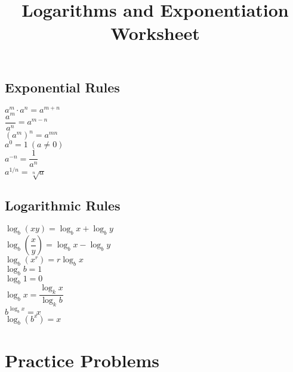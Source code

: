\documentclass[12pt]{article}
\title{Logarithms and Exponentiation Worksheet}
\author{}
\date{}
\begin{document}
\begin{multicols}{2}
\subsection*{Exponential Rules}
\begin{flushleft}
$ a^m \cdot a^n = a^{m+n} $ \\
$ \dfrac{a^m}{a^n} = a^{m-n} $ \\
$ (a^m)^n = a^{mn} $ \\
$ a^0 = 1 \ (a \ne 0) $ \\
$ a^{-n} = \dfrac{1}{a^n} $ \\
$ a^{1/n} = \sqrt[n]{a} $
\end{flushleft}

\subsection*{Logarithmic Rules}
\begin{flushleft}
$ \log_b(xy) = \log_b x + \log_b y $ \\
$ \log_b\left(\dfrac{x}{y}\right) = \log_b x - \log_b y $ \\
$ \log_b(x^r) = r \log_b x $ \\
$ \log_b b = 1 $ \\
$ \log_b 1 = 0 $ \\
$ \log_b x = \dfrac{\log_k x}{\log_k b} $ \\
$ b^{\log_b x} = x $ \\
$ \log_b(b^x) = x $
\end{flushleft}
\end{multicols}

\section*{Practice Problems}
\end{document}
